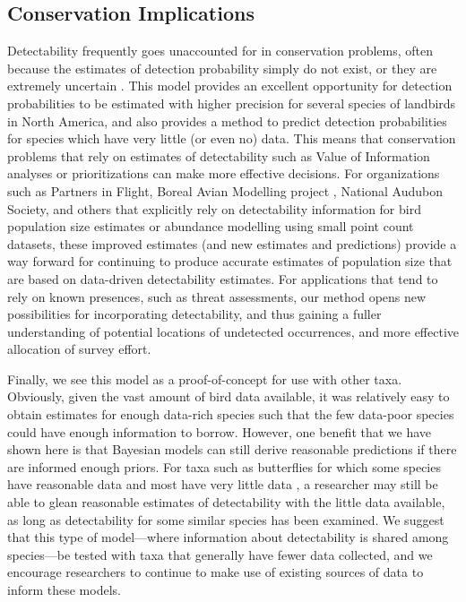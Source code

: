 \documentclass[12pt]{article}
\begin{document}
\subsection{Conservation Implications}
\par Detectability frequently goes unaccounted for in conservation problems, often because the estimates of detection probability simply do not exist, or they are extremely uncertain \citep{bennett_how_2024}.
This model provides an excellent opportunity for detection probabilities to be estimated with higher precision for several species of landbirds in North America, and also provides a method to predict detection probabilities for species which have very little (or even no) data. 
This means that conservation problems that rely on estimates of detectability such as Value of Information analyses \citep{canessa_when_2015, bennett_when_2018} or prioritizations \citep{hanson_prioritizr_2022} can make more effective decisions.
For organizations such as Partners in Flight, Boreal Avian Modelling project \citep{cumming_toward_2010}, National Audubon Society, and others that explicitly rely on detectability information for bird population size estimates or abundance modelling using small point count datasets, these improved estimates (and new estimates and predictions) provide a way forward for continuing to produce accurate estimates of population size that are based on data-driven detectability estimates.
For applications that tend to rely on known presences, such as threat assessments, our method opens new possibilities for incorporating detectability, and thus gaining a fuller understanding of  potential locations of undetected occurrences, and more effective allocation of survey effort.

\par Finally, we see this model as a proof-of-concept for use with other taxa.
Obviously, given the vast amount of bird data available, it was relatively easy to obtain estimates for enough data-rich species such that the few data-poor species could have enough information to borrow. 
However, one benefit that we have shown here is that Bayesian models can still derive reasonable predictions if there are informed enough priors.
For taxa such as butterflies for which some species have reasonable data and most have very little data \citep{lewthwaite_geographical_2022}, a researcher may still be able to glean reasonable estimates of detectability with the little data available, as long as detectability for some similar species has been examined.
We suggest that this type of model---where information about detectability is shared among species---be tested with taxa that generally have fewer data collected, and we encourage researchers to continue to make use of existing sources of data \citep{binley_minimizing_2023} to inform these models.
\end{document}
